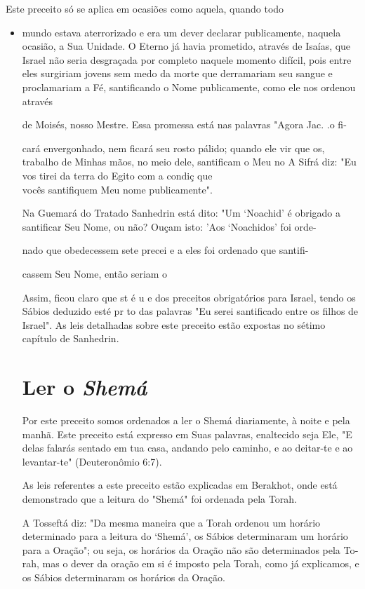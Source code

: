 \begin{itemize}
\begin{enumrate}
\begin{itemize}
Este preceito só se aplica em ocasiões como aquela, quando todo

\begin{itemize}
\item
 
 mundo estava aterrorizado e era um dever declarar publicamente,
 naquela ocasião, a Sua Unidade. O Eterno já havia prometido, através
 de Isaías, que Is­rael não seria desgraçada por completo naquele
 momento difícil, pois entre eles surgiriam jovens sem medo da morte
 que derramariam seu sangue e proclama­riam a Fé, santificando o Nome
 publicamente, como ele nos ordenou através


de Moisés, nosso Mestre. Essa promessa está nas palavras "Agora Jac.
.o fi-

cará envergonhado, nem ficará seu rosto pálido; quando ele vir que os,
 trabalho de Minhas mãos, no meio dele, santificam o Meu no A Sifrá
 diz: "Eu vos tirei da terra do Egito com a condiç que\\
 vocês santifiquem Meu nome publicamente".


Na Guemará do Tratado Sanhedrin está dito: "Um `Noachid' é obri­gado a
santificar Seu Nome, ou não? Ouçam isto: 'Aos `Noachidos' foi orde-

nado que obedecessem sete precei e a eles foi ordenado que santifi-

cassem Seu Nome, então seriam o

Assim, ficou claro que st é u e dos preceitos obrigatórios para Is­rael,
tendo os Sábios deduzido esté pr to das palavras "Eu serei santificado
entre os filhos de Israel". As leis detalhadas sobre este preceito estão
expostas no sétimo capítulo de Sanhedrin.

\section{Ler o \textit{Shemá}}

Por este preceito somos ordenados a ler o Shemá diariamente, à noi­te e
pela manhã. Este preceito está expresso em Suas palavras, enaltecido
seja Ele, "E delas falarás sentado em tua casa, andando pelo caminho, e
ao deitar-te e ao levantar-te" (Deuteronômio 6:7).

As leis referentes a este preceito estão explicadas em Berakhot, on­de
está demonstrado que a leitura do "Shemá" foi ordenada pela Torah.

A Tosseftá diz: "Da mesma maneira que a Torah ordenou um horá­rio
determinado para a leitura do `Shemá', os Sábios determinaram um horário
para a Oração"; ou seja, os horários da Oração não são determinados pela
To­rah, mas o dever da oração em si é imposto pela Torah, como já
explicamos, e os Sábios determinaram os horários da Oração.


\end{itemize}
\end{itemize}
\end{enumrate}
\end{itemize}
